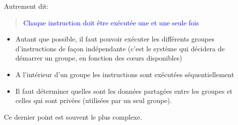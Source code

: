 \documentclass{beamer}
\begin{document}
\begin{frame}
	
Autrement dit:
\begin{quote}
\textcolor{blue}{Chaque instruction doit être exécutée une et une seule fois} 
\end{quote}

\vfill
\begin{itemize}
	\item Autant que possible, il faut pouvoir exécuter les différents groupes d'instructions de façon indépendante (c'est le système qui décidera de démarrer un groupe, en fonction des c\oe urs disponibles)
	
	\item A l'intérieur d'un groupe les instructions sont exécutées séquentiellement
	
	\item Il faut déterminer quelles sont les données partagées entre les groupes et celles qui sont privées (utilisées par un seul groupe).  
\end{itemize}

\vfill
Ce dernier point est souvent le plus complexe.
\end{frame}
\end{document}
